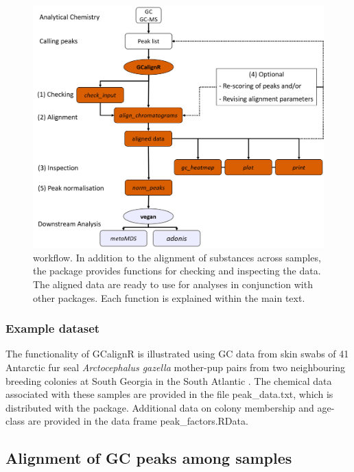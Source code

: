 \begin{figure}[htbp]
\centering
\includegraphics[width=13cm]{figures/workflow}
\caption{ workflow. In addition to the alignment of substances across samples, the package provides functions for checking and inspecting the data. The aligned data are ready to use for analyses in conjunction with other packages. Each function is explained within the main text.}
\label{figure:workflow}
\end{figure}

\subsubsection{Example dataset}\label{example-dataset}

The functionality of GCalignR is illustrated using GC data from skin
swabs of 41 Antarctic fur seal \emph{Arctocephalus gazella} mother-pup
pairs from two neighbouring breeding colonies at South Georgia in the
South Atlantic \citep{Stoffel.2015}. The chemical data associated with
these samples are provided in the file peak\_data.txt, which is
distributed with the package. Additional data on colony membership and
age-class are provided in the data frame peak\_factors.RData.

\subsection{Alignment of GC peaks among
samples}\label{alignment-of-gc-peaks-among-samples}

